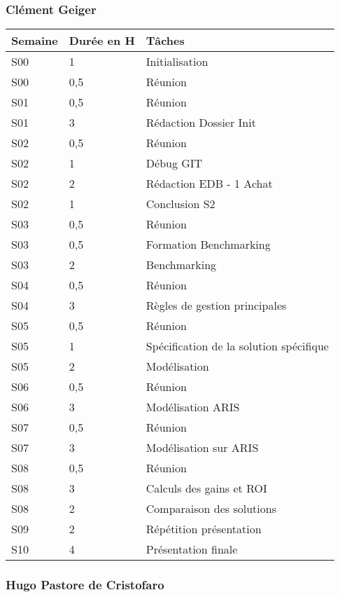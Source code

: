 \subsubsection{Clément Geiger}
\begin{tabular}{|l|l|l|}
\hline
Semaine&Durée en H&Tâches\\
\hline
S00&1&Initialisation\\
\hline
S00&0,5&Réunion\\
\hline
S01&0,5&Réunion\\
\hline
S01&3&Rédaction Dossier Init\\
\hline
S02&0,5&Réunion\\
\hline
S02&1&Débug GIT\\
\hline
S02&2&Rédaction EDB - 1 Achat\\
\hline
S02&1&Conclusion S2\\
\hline
S03&0,5&Réunion\\
\hline
S03&0,5&Formation Benchmarking\\
\hline
S03&2&Benchmarking\\
\hline
S04&0,5&Réunion\\
\hline
S04&3&Règles de gestion principales\\
\hline
S05&0,5&Réunion\\
\hline
S05&1&Spécification de la solution spécifique\\
\hline
S05&2&Modélisation\\
\hline
S06&0,5&Réunion\\
\hline
S06&3&Modélisation ARIS\\
\hline
S07&0,5&Réunion\\
\hline
S07&3&Modélisation sur ARIS\\
\hline
S08&0,5&Réunion\\
\hline
S08&3&Calculs des gains et ROI\\
\hline
S08&2&Comparaison des solutions\\
\hline
S09&2&Répétition présentation\\
\hline
S10&4&Présentation finale\\
\hline
\end{tabular}

\subsubsection{Hugo Pastore de Cristofaro}

